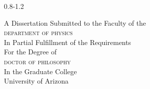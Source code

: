 \begin{titlingpage*}
\thispagestyle{empty}
\calccentering\unitlength
\begin{adjustwidth}{0.8\unitlength}{-1.2\unitlength}
\centering
  \maketitle
  A Dissertation Submitted to the Faculty of the\\
  {\scshape \MakeTextLowercase{Department of Physics}}\\
  In Partial Fulfillment of the Requirements\\
  For the Degree of\\
  {\scshape \MakeTextLowercase{Doctor of Philosophy}}\\
  In the Graduate College\\
  University of Arizona\\
  \bigskip
\end{adjustwidth}
\end{titlingpage*}

